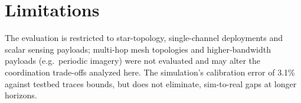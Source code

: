 \section{Limitations}
The evaluation is restricted to star-topology, single-channel deployments and scalar sensing
payloads; multi-hop mesh topologies and higher-bandwidth payloads (e.g.\ periodic imagery)
were not evaluated and may alter the coordination trade-offs analyzed here. The simulation's
calibration error of 3.1\% against testbed traces bounds, but does not eliminate,
sim-to-real gaps at longer horizons.
